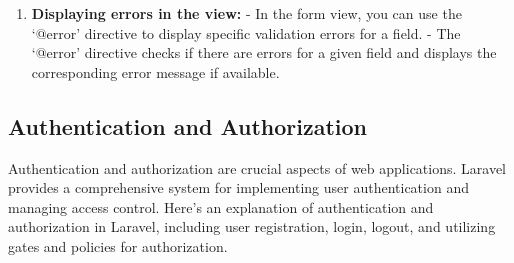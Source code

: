 \begin{itemize}
\begin{enumerate}
   \item \textbf{Displaying errors in the view:}
   - In the form view, you can use the `@error' directive to display specific validation errors for a field.
   - The `@error' directive checks if there are errors for a given field and displays the corresponding error message if available.
\end{enumerate} 
\end{itemize}
\subsection{Authentication and Authorization}
Authentication and authorization are crucial aspects of web applications. Laravel provides a comprehensive system for implementing user authentication and managing access control. Here's an explanation of authentication and authorization in Laravel, including user registration, login, logout, and utilizing gates and policies for authorization.

